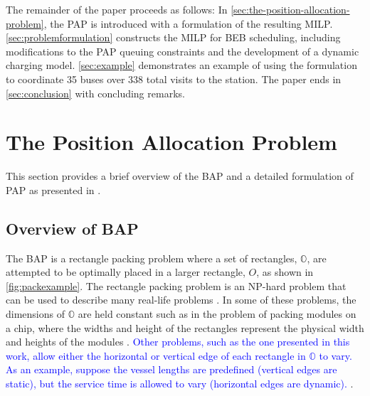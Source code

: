 \documentclass[utf8]{FrontiersinHarvard}
\let\cite\citep                                       %
\newcommand{\A}{35 }                                                            %
\newcommand{\N}{338 }                                                           %
\begin{document}
The remainder of the paper proceeds as follows: In \autoref{sec:the-position-allocation-problem}, the PAP is introduced
with a formulation of the resulting MILP. \autoref{sec:problemformulation} constructs the MILP for BEB scheduling,
including modifications to the PAP queuing constraints and the development of a dynamic charging model.
\autoref{sec:example} demonstrates an example of using the formulation to coordinate \A buses over \N total visits to
the station. The paper ends in \autoref{sec:conclusion} with concluding remarks.
\section{The Position Allocation Problem}
\label{sec:the-position-allocation-problem}
This section provides a brief overview of the BAP and a detailed formulation of PAP as presented in
\cite{qarebagh-2019-optim-sched}.

\subsection{Overview of BAP}
\label{sec:overview-of-bap}
The BAP is a rectangle packing problem where a set of rectangles, \(\mathbb{O}\), are attempted to be optimally placed in
a larger rectangle, \(O\), as shown in \autoref{fig:packexample}. The rectangle packing problem is an NP-hard problem that
can be used to describe many real-life problems \cite{bruin-2013-rectan-packin,murata-1995-rectan}. In some of these
problems, the dimensions of \(\mathbb{O}\) are held constant such as in the problem of packing modules on a chip, where
the widths and height of the rectangles represent the physical width and heights of the modules
\cite{murata-1995-rectan}. \textcolor{blue}{Other problems, such as the one presented in this work, allow either the horizontal or vertical edge of each rectangle in $\mathbb{O}$ to vary. As an example, suppose the vessel lengths are predefined (vertical edges are static), but the service time is allowed to vary (horizontal edges are dynamic).}
\cite{buhrkal-2011-model-discr}.
\end{document}
